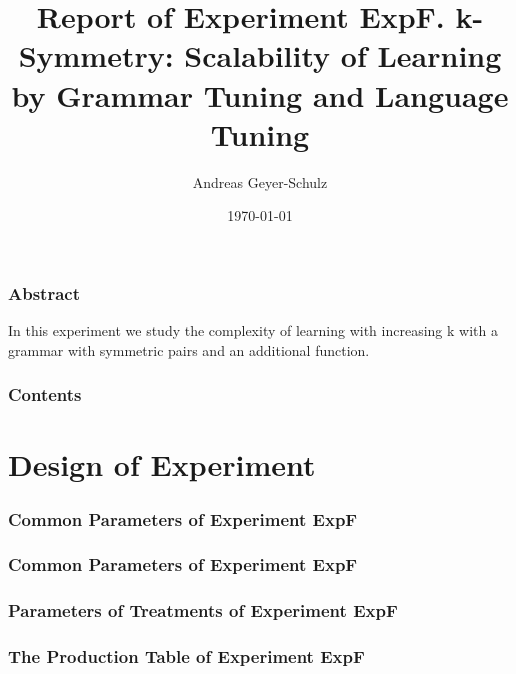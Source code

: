 \documentclass[18pt,c]{beamer}
\begin{document}
\title{Report of Experiment ExpF. k-Symmetry: Scalability of Learning by Grammar Tuning and Language Tuning  }
\author{Andreas Geyer-Schulz}
\date{\today}
\begin{frame}
\titlepage
\end{frame}
\begin{frame}
\frametitle{Abstract}
In this experiment we study the complexity of learning  with increasing k with a grammar with symmetric pairs and an additional function.%
\end{frame}
\begin{frame}[t, allowframebreaks]
\frametitle{Contents}
\tableofcontents[subsubsectionstyle=hide]
\vfill
\end{frame}
\clearpage
\section{Design of Experiment}
 \begin{frame}
 \fontsize{8pt}{9pt}\selectfont
 \frametitle{ Common Parameters of Experiment ExpF }

 \label{ExpFCommonTable000.tex}  
 \end{frame}

 \begin{frame}
 \fontsize{8pt}{9pt}\selectfont
 \frametitle{ Common Parameters of Experiment ExpF }

 \label{ExpFCommonTable001.tex}  
 \end{frame}

 \begin{frame}
 \fontsize{8pt}{9pt}\selectfont
 \frametitle{ Parameters of Treatments of Experiment ExpF }

 \label{ExpFDifferentTable000.tex}  
 \end{frame}

 \begin{frame}
 \fontsize{8pt}{9pt}\selectfont
 \frametitle{ The Production Table of Experiment ExpF }

 \label{ExpFGrammarTable000.tex}  
 \end{frame}
\end{document}

